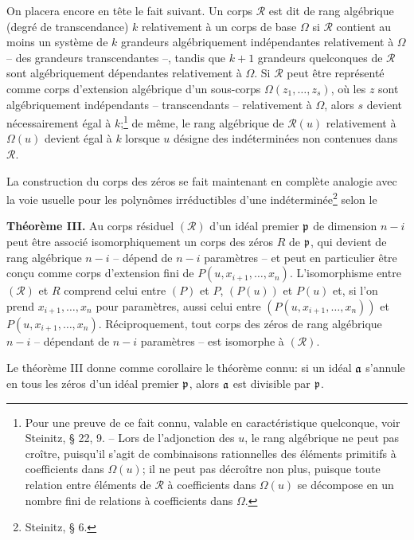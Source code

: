 On placera encore en tête le fait suivant. Un corps $\mathcal R$ est dit de rang algébrique (degré de transcendance) $k$ relativement à un corps de base $\Omega$ si $\mathcal R$ contient au moins un système de $k$ grandeurs algébriquement indépendantes relativement à $\Omega$ -- des grandeurs transcendantes --, tandis que $k+1$ grandeurs quelconques de $\mathcal R$ sont algébriquement dépendantes relativement à $\Omega$. Si $\mathcal R$ peut être représenté comme corps d'extension algébrique d'un sous-corps $\Omega(z_1,\ldots,z_s)$, où les $z$ sont algébriquement indépendants -- transcendants -- relativement à $\Omega$, alors $s$ devient nécessairement égal à $k$;\footnote{Pour une preuve de ce fait connu, valable en caractéristique quelconque, voir Steinitz, \S{} 22, 9. -- Lors de l'adjonction des $u$, le rang algébrique ne peut pas croître, puisqu'il s'agit de combinaisons rationnelles des éléments primitifs à coefficients dans $\Omega(u)$; il ne peut pas décroître non plus, puisque toute relation entre éléments de $\mathcal R$ à coefficients dans $\Omega(u)$ se décompose en un nombre fini de relations à coefficients dans $\Omega$.} de même, le rang algébrique de $\mathcal R(u)$ relativement à $\Omega(u)$ devient égal à $k$ lorsque $u$ désigne des indéterminées non contenues dans $\mathcal R$.

La construction du corps des zéros se fait maintenant en complète analogie avec la voie usuelle pour les polynômes irréductibles d'une indéterminée\footnote{Steinitz, \S{} 6.} selon le

\textbf{Théorème III.} Au corps résiduel $(\mathcal R)$ d'un idéal premier $\mathfrak p$ de dimension $n-i$ peut être associé isomorphiquement un corps des zéros $R$ de $\mathfrak p$, qui devient de rang algébrique $n-i$ -- dépend de $n-i$ paramètres -- et peut en particulier être conçu comme corps d'extension fini de $P(u,x_{i+1},\ldots,x_n)$. L'isomorphisme entre $(\mathcal R)$ et $R$ comprend celui entre $(P)$ et $P$, $(P(u))$ et $P(u)$ et, si l'on prend $x_{i+1},\ldots,x_n$ pour paramètres, aussi celui entre $(P(u,x_{i+1},\ldots,x_n))$ et $P(u,x_{i+1},\ldots,x_n)$. Réciproquement, tout corps des zéros de rang algébrique $n-i$ -- dépendant de $n-i$ paramètres -- est isomorphe à $(\mathcal R)$.

Le théorème III donne comme corollaire le théorème connu: si un idéal $\mathfrak a$ s'annule en tous les zéros d'un idéal premier $\mathfrak p$, alors $\mathfrak a$ est divisible par $\mathfrak p$.


